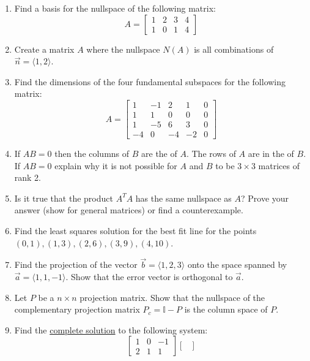 \documentclass[10pt, a4paper]{article}
\theoremstyle{break}
\begin{document}
\begin{enumerate}
\item Find a basis for the nullspace of the following matrix:
\begin{equation}
A=
\begin{bmatrix}
1 & 2 & 3 &4 \\
1 &0 & 1 &4 
\end{bmatrix}
\nonumber
\end{equation}
\item Create a matrix $A$ where the nullspace $N(A)$ is all combinations of $\vec{n}=\langle 1, 2 \rangle$.
\item  Find the dimensions of the four fundamental subspaces for the following matrix:
\begin{equation}
A=
\begin{bmatrix}
1 & -1 & 2 &1 & 0 \\
1 & 1 & 0 & 0 & 0\\
1 & -5 & 6 & 3 & 0\\
-4 & 0 &-4 & -2 & 0
\end{bmatrix}
\end{equation}
\item If $AB=0$ then the columns of $B$ are the \underline{\hspace{1cm}} of $A$. The rows of $A$ are in the  \underline{\hspace{1cm}} of $B$. If $AB=0$ explain why it is not possible for $A$ and $B$ to be $3 \times 3$ matrices of rank 2. 
\item Is it true that the product $A^TA$ has the same nullspace as $A$? Prove your answer (show for general matrices) or find a counterexample. 
\item Find the least squares solution for the best fit line for the points $(0,1), (1,3), (2,6),(3,9),(4,10)$. 
\item Find the projection of the vector $\vec{b}=\langle 1,2,3 \rangle$ onto the space spanned by $\vec{a}=\langle 1,1,-1 \rangle$. Show that the error vector is orthogonal to $\vec{a}$. 
\item Let $P$ be a $n \times n$ projection matrix. Show that the nullspace of the complementary projection matrix $P_c=\mathbb{I}-P$ is the column space of $P$. 
\item Find the \underline{complete solution} to the following system:
$$
\begin{bmatrix}
1 & 0 & -1 \\
2 & 1 & 1
\end{bmatrix}
\begin{bmatrix}

\end{bmatrix}$$
\end{enumerate}
\end{document}
